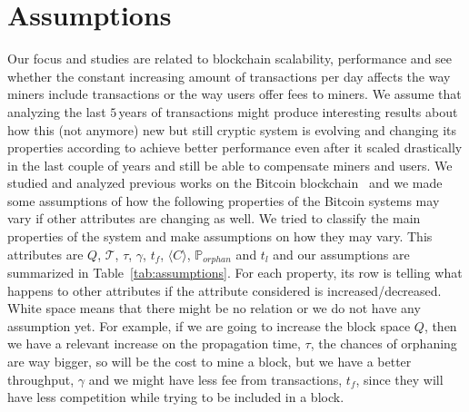\documentclass[USenglish]{uit-thesis}
\begin{document}
\section{Assumptions} %
\label{sec:assumptions}
Our focus and studies
are related to blockchain scalability, performance and
see whether the constant increasing amount of transactions
per day affects the way miners include transactions
or the way users offer fees to miners.
We assume that analyzing the last $5$\,years
of transactions might produce interesting
results about how this (not anymore) new but still
cryptic system is evolving and changing its
properties according to achieve better performance
even after it scaled drastically in the last couple of
years and still be able to compensate miners and users.
We studied and analyzed previous works on the Bitcoin
blockchain~\cite{croman2016, Rizun:2015:blocksizelimit,
	Moser2015, Decker2013IPBN}
and we made some assumptions of how
the following properties of the Bitcoin systems may vary if other
attributes are changing as well. We tried to classify the main
properties of the system and make assumptions on how they
may vary. This attributes are $Q$, $\mathcal{T}$, $\tau$,
$\gamma$, $t_f$, $\langle C\rangle$, $\mathbb{P}_{orphan}$ and $t_l$ and
our assumptions are summarized in Table~\ref{tab:assumptions}. For
each property, its row is telling what happens to other attributes
if the attribute considered is increased/decreased. White space
means that there might be no relation or we do not have any assumption
yet. For example, if we are going to increase the block space $Q$,
then we have a relevant increase on the propagation time, $\tau$,
the chances of orphaning are way bigger, so will be the cost to mine a block,
but we have a better throughput, $\gamma$ and we might have
less fee from transactions, $t_f$, since they will have less competition
while trying to be included in a block.
\end{document}
